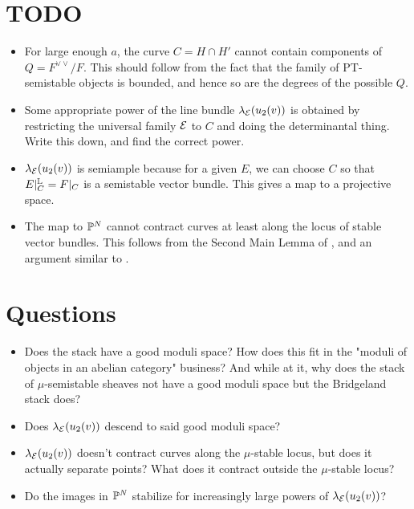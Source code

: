 \documentclass[letterpaper,10pt]{article}
\theoremstyle{remark}
\begin{document}
\section{TODO}
\begin{itemize}
    \item For large enough $a$, the curve $C = H \cap H'$ cannot contain components of $Q = F^{\vee\vee}/F$. This should follow from the fact that the family of PT-semistable objects is bounded, and hence so are the degrees of the possible $Q$.
    \item Some appropriate power of the line bundle $\lambda_{\mathcal{E}}(u_2(v))$ is obtained by restricting the universal family $\mathcal{E}$ to $C$ and doing the determinantal thing. Write this down, and find the correct power.
    \item $\lambda_{\mathcal{E}}(u_2(v))$ is semiample because for a given $E$, we can choose $C$ so that $E|^{\mathbb{L}}_C = F|_C$ is a semistable vector bundle. This gives a map to a projective space.
    \item The map to $\mathbb{P}^N$ cannot contract curves at least along the locus of stable vector bundles. This follows from the Second Main Lemma of \cite{seshadri}, and an argument similar to \cite[Lemma 8.2.12]{HL}.
\end{itemize}

\section{Questions}
\begin{itemize}
    \item Does the stack have a good moduli space? How does this fit in the "moduli of objects in an abelian category" business? And while at it, why does the stack of $\mu$-semistable sheaves not have a good moduli space but the Bridgeland stack does?
    \item Does $\lambda_{\mathcal{E}}(u_2(v))$ descend to said good moduli space?
    \item $\lambda_{\mathcal{E}}(u_2(v))$ doesn't contract curves along the $\mu$-stable locus, but does it actually separate points? What does it contract outside the $\mu$-stable locus?
    \item Do the images in $\mathbb{P}^N$ stabilize for increasingly large powers of $\lambda_{\mathcal{E}}(u_2(v))$?
\end{itemize}



\end{document}
